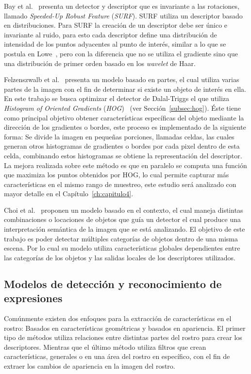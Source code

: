 Bay et al.~\cite{surf2008} presenta un detector y descriptor que es invariante a las rotaciones, llamado \textit{Speeded-Up Robust Feature} (\textit{SURF}). SURF utiliza un descriptor basado en distribuciones. Para SURF la creación de un descriptor debe ser único e invariante al ruido, para esto cada descriptor define una distribución de intensidad de los puntos adyacentes al punto de interés, similar a lo que se postula en Lowe~\cite{sift2004}, pero con la diferencia que no se utiliza el gradiente sino que una distribución de primer orden basado en los \textit{wavelet} de Haar.

Felzenszwalb et al.~\cite{Felzenszwalb2010} presenta un modelo basado en partes,  el cual utiliza varias partes de la imagen con el fin de determinar si existe un objeto de interés en ella. En este trabajo se busca optimizar el detector de Dalal-Triggs el que utiliza \textit{Histogram of Oriented Gradients} (\textit{HOG})~\cite{hog2005} (ver Sección~\ref{subsec:hog}). Éste tiene como principal objetivo obtener características específicas del objeto mediante la dirección de los gradientes o bordes, este proceso es implementado de la siguiente forma: Se divide la imagen en pequeñas porciones, llamadas celdas, las cuales generan otros histogramas de gradientes o bordes por cada pixel dentro de esta celda, combinando estos histogramas se obtiene la representación del descriptor. La mejora realizada sobre este método es que en paralelo se computa una función que maximiza los puntos obtenidos por HOG\@, lo cual permite capturar más características en el mismo rango de muestreo, este estudio será analizado con mayor detalle en el Capítulo~\ref{ch:capitulo4}.

Choi et al.~\cite{treebased2012} proponen un modelo basado en el contexto, el cual maneja distintas combinaciones o locaciones de objetos que guía un detector el cual produce una interpretación semántica de la imagen que se está analizando. El objetivo de este trabajo es poder detectar múltiples categorías de objetos dentro de una misma escena. Por lo cual su modelo utiliza características globales dependientes entre las categorías de los objetos y las salidas locales de los descriptores utilizados.

\subsection{Modelos de detección y reconocimiento de expresiones}\label{subsec:expre}
Comúnmente existen dos enfoques para la extracción de características en el rostro: Basados en características geométricas y basados en apariencia. El primer tipo de métodos utiliza relaciones entre distintas partes del rostro para crear los descriptores. Mientras que el último método utiliza filtros que crean características, generales o en una área del rostro en específico, con el fin de extraer los cambios de apariencia en la imagen del rostro.


